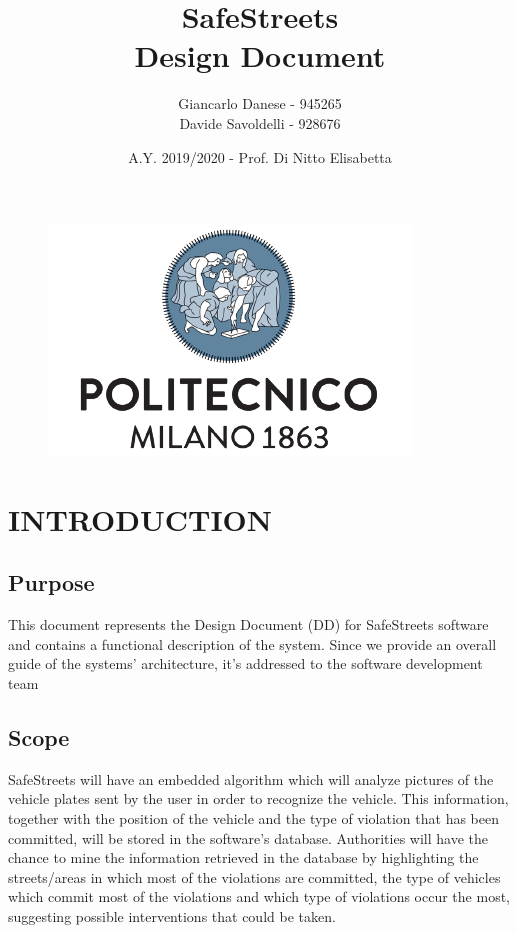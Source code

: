 \documentclass[12pt,a4paper]{article}
\begin{document}
	\begin{figure}
		\centering
		\includegraphics[width=1.0\linewidth]{../assets/images/logo_poli.pdf}
	\end{figure}

\author{Giancarlo Danese - 945265\\
	Davide Savoldelli - 928676}
\date{A.Y. 2019/2020 - Prof. Di Nitto Elisabetta}


\title{
	\textbf{\Huge{SafeStreets}} \\
	\large Design Document
}



	\maketitle
	\newpage
	\tableofcontents
	\newpage

\section{INTRODUCTION}
\subsection{Purpose}
This document represents the Design Document (DD) for SafeStreets software and contains a functional description of the system. Since we provide an overall guide of the systems' architecture, it's addressed to the software development team
\subsection{Scope}
SafeStreets will have an embedded algorithm which will analyze pictures of the vehicle plates sent by the user in order to recognize the vehicle. This information, together with the position of the vehicle and the type of violation that has been committed, will be stored in the software's database.
\newline
Authorities will have the chance to mine the information retrieved in the database by highlighting the streets/areas in which most of the violations are committed, the type of vehicles which commit most of the violations and which type of violations occur the most, suggesting possible interventions that could be taken.	
\end{document}
